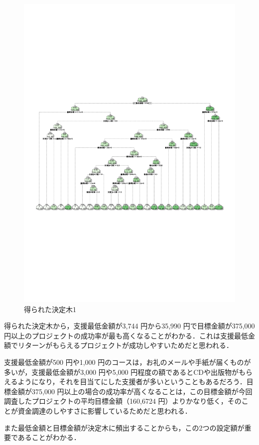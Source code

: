 \begin{figure}[H]
\centering
\includegraphics[width=13cm]{figure19.pdf}
\caption{得られた決定木1}\label{sannp}
\end{figure}

得られた決定木から，支援最低金額が3,744 円から35,990 円で目標金額が375,000 円以上のプロジェクトの成功率が最も高くなることがわかる．これは支援最低金額でリターンがもらえるプロジェクトが成功しやすいためだと思われる．

支援最低金額が500 円や1,000 円のコースは，お礼のメールや手紙が届くものが多いが，支援最低金額が3,000 円や5,000 円程度の額であるとCDや出版物がもらえるようになり，それを目当てにした支援者が多いということもあるだろう．目標金額が375,000 円以上の場合の成功率が高くなることは，この目標金額が今回調査したプロジェクトの平均目標金額（160,6724 円）よりかなり低く，そのことが資金調達のしやすさに影響しているためだと思われる．

また最低金額と目標金額が決定木に頻出することからも，この2つの設定額が重要であることがわかる．

